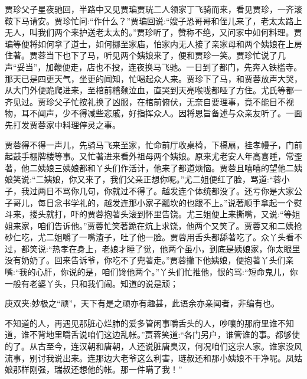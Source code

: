 \begin{parag}
    贾珍父子星夜驰回，半路中又见贾㻞贾珖二人领家丁飞骑而来，看见贾珍，一齐滚鞍下马请安。贾珍忙问:“作什么？”贾㻞回说:“嫂子恐哥哥和侄儿来了，老太太路上无人，叫我们两个来护送老太太的。”贾珍听了，赞称不绝，又问家中如何料理。贾㻞等便将如何拿了道士，如何挪至家庙，怕家内无人接了亲家母和两个姨娘在上房住著。贾蓉当下也下了马，听见两个姨娘来了，便和贾珍一笑。贾珍忙说了几声“妥当”，加鞭便走，店也不投，连夜换马飞驰。一日到了都门，先奔入铁槛寺。那天已是四更天气，坐更的闻知，忙喝起众人来。贾珍下了马，和贾蓉放声大哭，从大门外便跪爬进来，至棺前稽颡泣血，直哭到天亮喉咙都哑了方住。尤氏等都一齐见过。贾珍父子忙按礼换了凶服，在棺前俯伏，无奈自要理事，竟不能目不视物，耳不闻声，少不得减些悲戚，好指挥众人。因将恩旨备述与众亲友听了。一面先打发贾蓉家中料理停灵之事。
\end{parag}


\begin{parag}
    贾蓉得不得一声儿，先骑马飞来至家，忙命前厅收桌椅，下槅扇，挂孝幔子，门前起鼓手棚牌楼等事。又忙著进来看外祖母两个姨娘。原来尤老安人年高喜睡，常歪著，他二姨娘三姨娘都和丫头们作活计，他来了都道烦恼。贾蓉且嘻嘻的望他二姨娘笑说:“二姨娘，你又来了，我们父亲正想你呢。”尤二姐便红了脸，骂道:“蓉小子，我过两日不骂你几句，你就过不得了。越发连个体统都没了。还亏你是大家公子哥儿，每日念书学礼的，越发连那小家子瓢坎的也跟不上。”说著顺手拿起一个熨斗来，搂头就打，吓的贾蓉抱著头滚到怀里告饶。尤三姐便上来撕嘴，又说:“等姐姐来家，咱们告诉他。”贾蓉忙笑著跪在炕上求饶，他两个又笑了。贾蓉又和二姨抢砂仁吃，尤二姐嚼了一嘴渣子，吐了他一脸。贾蓉用舌头都舔著吃了。众丫头看不过，都笑说:“热孝在身上，老娘才睡了觉，他两个虽小，到底是姨娘家，你太眼里没有奶奶了。回来告诉爷，你吃不了兜著走。”贾蓉撇下他姨娘，便抱著丫头们亲嘴:“我的心肝，你说的是，咱们馋他两个。”丫头们忙推他，恨的骂:“短命鬼儿，你一般有老婆丫头，只和我们闹。知道的说是顽；\begin{note}庚双夹:妙极之“顽”，天下有是之顽亦有趣甚，此语余亦亲闻者，非编有也。\end{note}不知道的人，再遇见那脏心烂肺的爱多管闲事嚼舌头的人，吵嚷的那府里谁不知道，谁不背地里嚼舌说咱们这边乱帐。”贾蓉笑道:“各门另户，谁管谁的事。都够使的了。从古至今，连汉朝和唐朝，人还说脏唐臭汉，何况咱们这宗人家。谁家没风流事，别讨我说出来。连那边大老爷这么利害，琏叔还和那小姨娘不干净呢。凤姑娘那样刚强，瑞叔还想他的帐。那一件瞒了我！”
\end{parag}


